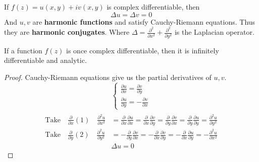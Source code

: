 \begin{theorem}
    If $f(z) = u(x,y) + iv(x,y)$ is complex differentiable, then
    $$ \Delta u  = \Delta v = 0$$
    And $u, v$ are \textbf{harmonic functions} and satisfy Cauchy-Riemann equations. Thus they are \textbf{harmonic conjugates}.
    Where $\Delta = \frac{\partial^2}{\partial x^2} + \frac{\partial^2}{\partial y^2}$ is the Laplacian operator.
\end{theorem}

\begin{corollary}
    If a function $f(z)$ is once complex differentiable, then it is infinitely differentiable and analytic.
\end{corollary}

\begin{proof}
    Cauchy-Riemann equations give us the partial derivatives of $u, v$.
    $$
        \begin{cases}
            \frac{\partial u}{\partial x} = \frac{\partial v}{\partial y} \\
            \frac{\partial u}{\partial y} = -\frac{\partial v}{\partial x}
        \end{cases}$$
    \begin{align*}                                                                                                                                                                                                                      \\
        \text{Take} \quad \frac{\partial}{\partial x}(1) \quad \frac{\partial^2 u}{\partial x^2} & = \frac{\partial}{\partial x} \frac{\partial u}{\partial x} = \frac{\partial}{\partial x} \frac{\partial v}{\partial y} = \frac{\partial}{\partial y} \frac{\partial v}{\partial x} = \frac{\partial}{\partial y} \frac{\partial u}{\partial y} = \frac{\partial^2 u}{\partial y^2} \\
        \text{Take} \quad \frac{\partial}{\partial y}(2) \quad \frac{\partial^2 u}{\partial y^2} & = -\frac{\partial}{\partial y} \frac{\partial v}{\partial x} = -\frac{\partial}{\partial x} \frac{\partial v}{\partial y} = -\frac{\partial}{\partial x} \frac{\partial u}{\partial y} = -\frac{\partial^2 u}{\partial x^2}                                                         \\
                                                                                                 & \Delta u = 0
    \end{align*}
\end{proof}

